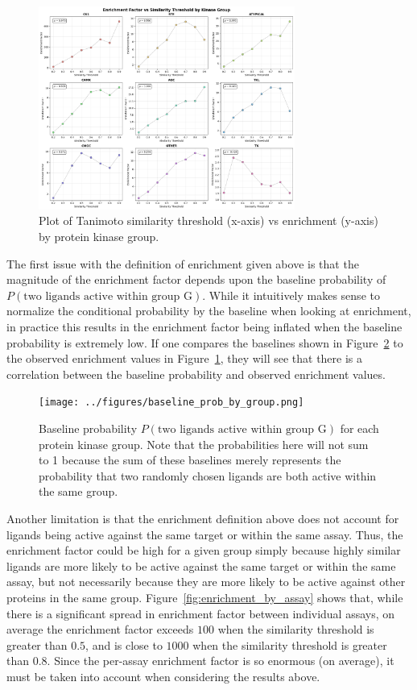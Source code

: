 \documentclass[11pt]{article}
\begin{document}
\begin{figure}[H]
    \centering
    \includegraphics[width=0.75\textwidth]{../figures/enrichment_factor_by_group.png}
    \caption{Plot of Tanimoto similarity threshold (x-axis) vs enrichment (y-axis) by protein kinase group.}\label{fig:enrichment_plot}
\end{figure}

The first issue with the definition of enrichment given above is that the magnitude of the enrichment factor depends upon the baseline probability of $P(\text{two ligands active within group G})$. 
While it intuitively makes sense to normalize the conditional probability by the baseline when looking at enrichment, in practice this results in the enrichment factor being inflated when the baseline probability is extremely low.  
If one compares the baselines shown in Figure~\ref{fig:baseline_probs} to the observed enrichment values in Figure~\ref{fig:enrichment_plot}, they will see that there is a correlation between the baseline probability and observed enrichment values. 

\begin{figure}[H]
    \centering
    \texttt{[image: ../figures/baseline\_prob\_by\_group.png]}
    \caption{Baseline probability $P(\text{two ligands active within group G})$ for each protein kinase group. Note that the probabilities here will not sum to 1 because the sum of these baselines merely represents the probability that two randomly chosen ligands are both active within the same group.}\label{fig:baseline_probs}
\end{figure}

Another limitation is that the enrichment definition above does not account for ligands being active against the same target or within the same assay. 
Thus, the enrichment factor could be high for a given group simply because highly similar ligands are more likely to be active against the same target or within the same assay, but not necessarily because they are more likely to be active against other proteins in the same group. 
Figure~\ref{fig:enrichment_by_assay} shows that, while there is a significant spread in enrichment factor between individual assays, on average the enrichment factor exceeds $100$ when the similarity threshold is greater than $0.5$, and is close to $1000$ when the similarity threshold is greater than $0.8$. 
Since the per-assay enrichment factor is so enormous (on average), it must be taken into account when considering the results above. 
\end{document}
